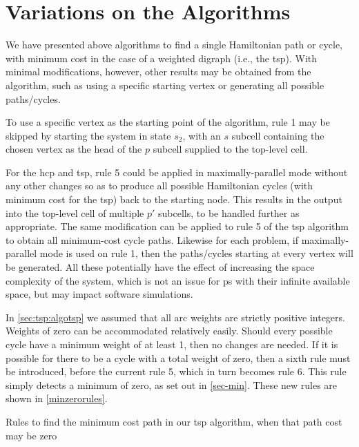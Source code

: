 \section{\label{sec:tsp:variations}Variations on the Algorithms}
We have presented above algorithms to find a single Hamiltonian path or cycle, with minimum cost in the case of a weighted digraph (i.e., the \gls{tsp}).  With minimal modifications, however, other results may be obtained from the algorithm, such as using a specific starting vertex or generating all possible paths/cycles.

To use a specific vertex as the starting point of the algorithm, rule 1 may be skipped by starting the system in state \(s_2\), with an \(s\) subcell containing the chosen vertex as the head of the \(p\) subcell supplied to the top-level cell.

For the \gls{hcp} and \gls{tsp}, rule 5 could be applied in maximally-parallel mode without any other changes so as to produce all possible Hamiltonian cycles (with minimum cost for the \gls{tsp}) back to the starting node.  This results in the output into the top-level cell of multiple \(p'\) subcells, to be handled further as appropriate.  The same modification can be applied to rule 5 of the \gls{tsp} algorithm to obtain all minimum-cost cycle paths.  Likewise for each problem, if maximally-parallel mode is used on rule 1, then the paths/cycles starting at every vertex will be generated.  All these potentially have the effect of increasing the space complexity of the system, which is not an issue for \gls{ps} with their infinite available space, but may impact software simulations.

In \cref{sec:tsp:algotsp} we assumed that all arc weights are strictly positive integers.  Weights of zero can be accommodated relatively easily.  Should every possible cycle have a minimum weight of at least 1, then no changes are needed.  If it is possible for there to be a cycle with a total weight of zero, then a sixth rule must be introduced, before the current rule 5, which in turn becomes rule 6.  This rule simply detects a minimum of zero, as set out in \cref{sec-min}.  These new rules are shown in \cref{minzerorules}.


\begin{cprulesetfloat}
\begin{cpruleset}
    
    
\end{cpruleset}
\caption[Rules to find the minimum cost path when it may be zero]{\label{minzerorules}Rules to find the minimum cost path in our \gls{tsp} algorithm, when that path cost may be zero}
\end{cprulesetfloat}